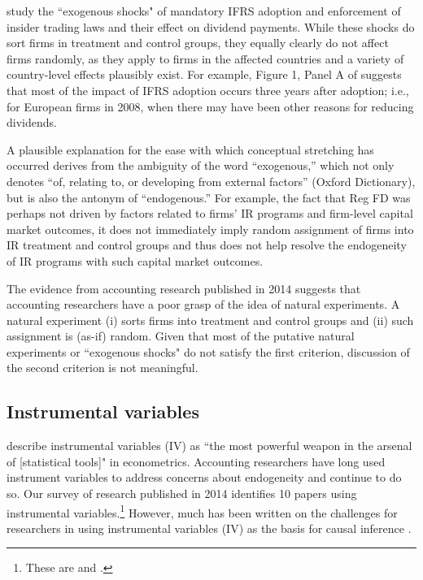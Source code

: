 \documentclass[11pt,reqno]{amsart}
\begin{document}
\citet{Hail:2014fq} study the ``exogenous shocks" of mandatory IFRS adoption and enforcement of insider trading laws and their effect on dividend payments.
While these shocks do sort firms in treatment and control groups, they equally clearly do not affect firms randomly, as they apply to firms in the affected countries and a variety of country-level effects plausibly exist. 
For example,  Figure 1, Panel A of \citet{Hail:2014fq} suggests that most of the impact of IFRS adoption occurs three years after adoption; i.e., for European firms in 2008, when there may have been other reasons for reducing dividends.

A plausible explanation for the ease with which conceptual stretching has occurred derives from the ambiguity of the word ``exogenous,'' which not only denotes  ``of, relating to, or developing from external factors'' (Oxford Dictionary), but is also the antonym of ``endogenous.''
For example, the fact that Reg FD was perhaps not driven by factors related to firms' IR programs and firm-level capital market outcomes, it does not immediately imply random assignment of firms into IR treatment and control groups and thus does not help resolve the endogeneity of IR programs with such capital market outcomes.

The evidence from accounting research published in 2014 suggests that accounting researchers have a poor grasp of the idea of natural experiments.
A natural experiment (i) sorts firms into treatment and control groups and (ii) such assignment is (as-if) random.
Given that most of the putative natural experiments or ``exogenous shocks" do not satisfy the first criterion, discussion of the second criterion is not meaningful.


\subsection{Instrumental variables}
\citet[p.114]{Angrist:2008vk} describe instrumental variables (IV) as ``the most powerful weapon in the arsenal of [statistical tools]" in econometrics. 
Accounting researchers have long used instrument variables to address concerns about endogeneity \citep{Larcker:2010fq} and continue to do so.  Our survey of research published in 2014 identifies 10 papers using instrumental variables.\footnote{These are \citet{Cannon:2014im,Cohen:2014jl,Kim:2014fm,Vermeer:2014bs,Fox:2014io,Guedhami:2013cj,Houston:2014hv,deFranco:2014ct,Erkens:2014hj} and \citet{Correia:2014fp}.}
However, much has been written on the challenges for researchers in using instrumental variables (IV) as the basis for causal inference \citep[e.g.,][]{Roberts:2013cz}. 
\end{document}
